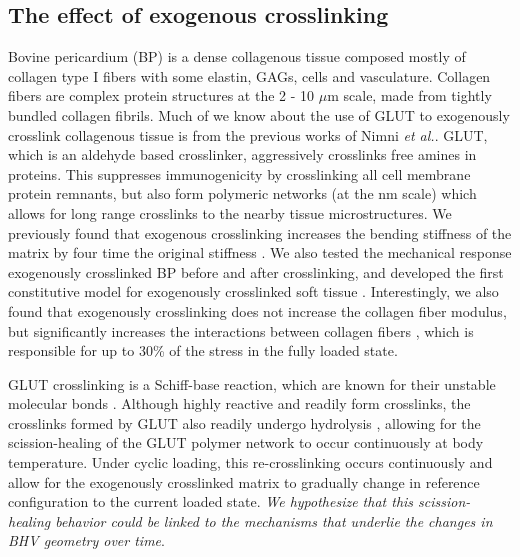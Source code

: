 \subsection{The effect of exogenous crosslinking}

	Bovine pericardium (BP) is a dense collagenous tissue composed mostly of collagen type I fibers with some elastin, GAGs, cells and vasculature. 
	Collagen fibers are complex protein structures at the 2 - 10 $\mu$m scale, made from tightly bundled collagen fibrils. 
	Much of we know about the use of GLUT to exogenously crosslink collagenous tissue is from the previous works of Nimni \textit{et al.}\cite{cheung_mechanism_1990, nimni_chemically_1987, cheung_mechanism_1985, gendler_toxic_1984, cheung_presence_1983, cheung_mechanism_1982, cheung_mechanism_1982b}. 
	GLUT, which is an aldehyde based crosslinker, aggressively crosslinks free amines in proteins. 
	This suppresses immunogenicity by crosslinking all cell membrane protein remnants, but also form polymeric networks (at the nm scale) which allows for long range crosslinks to the nearby tissue microstructures. 
	We previously found that exogenous crosslinking increases the bending stiffness of the matrix by four time the original stiffness \cite{mirnajafi_effects_2010}.
	We also tested the mechanical response exogenously crosslinked BP before and after crosslinking, and developed the first constitutive model for exogenously crosslinked soft tissue \cite{sacks_novel_2016}. 
	Interestingly, we also found that exogenously crosslinking does not increase the collagen fiber modulus, but significantly increases the interactions between collagen fibers \cite{sacks_novel_2016}, which is responsible for up to 30\% of the stress in the fully loaded state. 


	GLUT crosslinking is a Schiff-base reaction, which are known for their unstable molecular bonds \cite{migneault_glutaraldehyde_2004, damink_glutaraldehyde_1995}. 
	Although highly reactive and readily form crosslinks, the crosslinks formed by GLUT also readily undergo hydrolysis \cite{migneault_glutaraldehyde_2004}, allowing for the scission-healing of the GLUT polymer network to occur continuously at body temperature. 
	Under cyclic loading, this re-crosslinking occurs continuously and allow for the exogenously crosslinked matrix to gradually change in reference configuration to the current loaded state. 
	\emph{We hypothesize that this scission-healing behavior could be linked to the  mechanisms that underlie the changes in BHV geometry over time}. 
	
